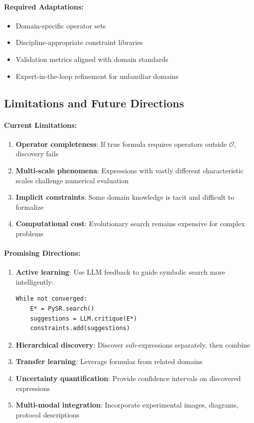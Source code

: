 \paragraph{Required Adaptations:}
\begin{itemize}
\item Domain-specific operator sets
\item Discipline-appropriate constraint libraries
\item Validation metrics aligned with domain standards
\item Expert-in-the-loop refinement for unfamiliar domains
\end{itemize}

\subsection{Limitations and Future Directions}

\paragraph{Current Limitations:}

\begin{enumerate}
\item \textbf{Operator completeness}: If true formula requires operators outside $\mathcal{O}$, discovery fails
\item \textbf{Multi-scale phenomena}: Expressions with vastly different characteristic scales challenge numerical evaluation
\item \textbf{Implicit constraints}: Some domain knowledge is tacit and difficult to formalize
\item \textbf{Computational cost}: Evolutionary search remains expensive for complex problems
\end{enumerate}

\paragraph{Promising Directions:}

\begin{enumerate}
\item \textbf{Active learning}: Use LLM feedback to guide symbolic search more intelligently:
\begin{verbatim}
While not converged:
    E* = PySR.search()
    suggestions = LLM.critique(E*)
    constraints.add(suggestions)
\end{verbatim}

\item \textbf{Hierarchical discovery}: Discover sub-expressions separately, then combine
\item \textbf{Transfer learning}: Leverage formulas from related domains
\item \textbf{Uncertainty quantification}: Provide confidence intervals on discovered expressions
\item \textbf{Multi-modal integration}: Incorporate experimental images, diagrams, protocol descriptions
\end{enumerate}


